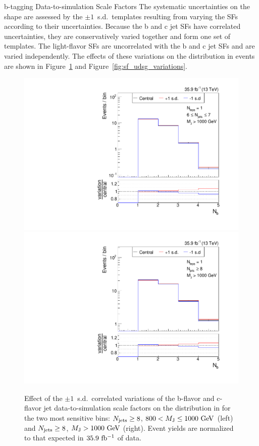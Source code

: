 \begin{section}{b-tagging Data-to-simulation Scale Factors}
The systematic uncertainties on the \Nb shape are assessed by the $\pm 1$~s.d.\ \Nb templates resulting from varying the SFs according to their uncertainties.
Because the b and c jet SFs have correlated uncertainties, they are conservatively varied together and form one set of templates.
The light-flavor SFs are uncorrelated with the b and c jet SFs and are varied independently.
The effects of these variations on the \Nb distribution in \ttbar events are shown in Figure~\ref{fig:sf_bc_variations} and Figure~\ref{fig:sf_udsg_variations}.

\begin{figure}[tbp!]
\begin{center}
\includegraphics[angle=0,width=0.45\columnwidth]{fig/bin20_ttbar_btag_bc_mconly.pdf}
\includegraphics[angle=0,width=0.45\columnwidth]{fig/bin21_ttbar_btag_bc_mconly.pdf}
\end{center}
\caption{Effect of the $\pm 1$~s.d.\ correlated variations of the b-flavor and c-flavor jet data-to-simulation scale factors on the \Nb distribution in \ttbar for the two most sensitive bins: $N_{\mathrm{jets}} \geq 8$, $800 < M_{\mathrm{J}} \leq 1000~\mathrm{Ge\kern -0.1em V}$ (left) and $N_{\mathrm{jets}} \geq 8$, $M_{\mathrm{J}} > 1000~\mathrm{Ge\kern -0.1em V}$ (right).
Event yields are normalized to that expected in $35.9~\mathrm{fb^{-1}}$ of data.}
\label{fig:sf_bc_variations}
\end{figure}


\end{section}
